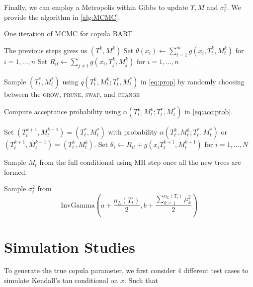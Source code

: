 \documentclass{amsart}
\begin{document}
Finally, we can employ a Metropolis within Gibbs to update $T,M$ and $\sigma_{t}^2$. We provide the algorithm in \cref{alg:MCMC}.
 
\begin{algorithm}
	\caption{One iteration of MCMC for copula BART}\label{alg:MCMC}
	\begin{algorithmic}[1]
		\State The previous steps gives us $(T^k,M^k)$
		\State Set $\theta(x_i) \leftarrow \sum_{t=1}^{m} g(x_i, T^k_t, M^k_t)$ for $i = 1, \ldots, n$
		\State Set $R_{it} \leftarrow \sum_{j\not=t}g(x_i, T_j^k, M_j^k)$ for $i = 1, \ldots, n$
		
		\State Sample $(T_t^\ast, M_t^\ast)$ using $q\left(T_t^k,M_t^k;T_t^\ast, M_t^\ast\right)$ in \cref{eq:prop} by randomly choosing between the \textsc{grow}, \textsc{prune}, \textsc{swap}, and \textsc{change} 
		
		\State Compute acceptance probability using $\alpha\left(T_t^k,M_t^k;T_t^\ast, M_t^\ast\right)$ in \cref{eq:acc:prob}.
		
		\State Set $(T_t^{k+1}, M_t^{k+1})=(T_t^\ast, M_t^\ast)$ with probability $\alpha\left(T_t^k,M_t^k;T_t^\ast, M_t^\ast\right)$ or $(T_t^{k+1}, M_t^{k+1})=(T_t^k,M_t^k)$.
		\State Set $\theta_i \leftarrow R_{it} + g(x_i T_t^{k+1}, M_t^{k+1})$ for $i = 1, \ldots, N$
		
		\State Sample $M_t$ from the full conditional using MH step once all the new trees are formed.
		
		\State Sample $\sigma_{t}^2$ from 
		\begin{equation*}
			\text{InvGamma}\left(a+\frac{n_L(T_t)}{2} , b + \frac{\sum_{k=1}^{n_L(T_t)}\mu_k^2}{2}\right)
		\end{equation*}
		\EndFor
	\end{algorithmic}
\end{algorithm}

\section{Simulation Studies}

To generate the true copula parameter, we first consider 4 different test cases to simulate Kendall's tau conditional on $x$. Such that
\end{document}
